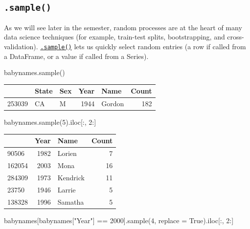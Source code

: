\documentclass[
  letterpaper,
  DIV=11,
  numbers=noendperiod]{scrreprt}
\newenvironment{Shaded}{\begin{snugshade}}{\end{snugshade}}
\newcommand{\DecValTok}[1]{\textcolor[rgb]{0.68,0.00,0.00}{#1}}
\newcommand{\NormalTok}[1]{\textcolor[rgb]{0.00,0.23,0.31}{#1}}
\newcommand{\OperatorTok}[1]{\textcolor[rgb]{0.37,0.37,0.37}{#1}}
\newcommand{\StringTok}[1]{\textcolor[rgb]{0.13,0.47,0.30}{#1}}
\newcommand{\VariableTok}[1]{\textcolor[rgb]{0.07,0.07,0.07}{#1}}
\begin{document}
\hypertarget{sample}{%
\subsection{\texorpdfstring{\texttt{.sample()}}{.sample()}}\label{sample}}

As we will see later in the semester, random processes are at the heart
of many data science techniques (for example, train-test splits,
bootstrapping, and cross-validation).
\href{https://pandas.pydata.org/docs/reference/api/pandas.DataFrame.sample.html}{\texttt{.sample()}}
lets us quickly select random entries (a row if called from a DataFrame,
or a value if called from a Series).

\begin{Shaded}
\begin{Highlighting}[]
\NormalTok{babynames.sample()}
\end{Highlighting}
\end{Shaded}

\begin{tabular}{lllrlr}
\toprule
{} & State & Sex &  Year &    Name &  Count \\
\midrule
253039 &    CA &   M &  1944 &  Gordon &    182 \\
\bottomrule
\end{tabular}

\begin{Shaded}
\begin{Highlighting}[]
\NormalTok{babynames.sample(}\DecValTok{5}\NormalTok{).iloc[:, }\DecValTok{2}\NormalTok{:]}
\end{Highlighting}
\end{Shaded}

\begin{tabular}{lrlr}
\toprule
{} &  Year &      Name &  Count \\
\midrule
90506  &  1982 &    Lorien &      7 \\
162054 &  2003 &      Mona &     16 \\
284309 &  1973 &  Kendrick &     11 \\
23750  &  1946 &    Larrie &      5 \\
138328 &  1996 &   Samatha &      5 \\
\bottomrule
\end{tabular}

\begin{Shaded}
\begin{Highlighting}[]
\NormalTok{babynames[babynames[}\StringTok{"Year"}\NormalTok{] }\OperatorTok{==} \DecValTok{2000}\NormalTok{].sample(}\DecValTok{4}\NormalTok{, replace }\OperatorTok{=} \VariableTok{True}\NormalTok{).iloc[:, }\DecValTok{2}\NormalTok{:]}
\end{Highlighting}
\end{Shaded}
\end{document}
